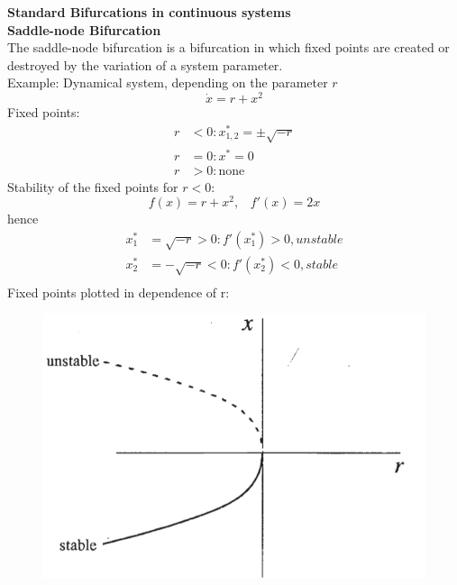 \textbf{Standard Bifurcations in continuous systems}\\
\textbf{Saddle-node Bifurcation}\\
The saddle-node bifurcation is a bifurcation in which fixed points are created or destroyed by the variation of a system parameter.\\
Example: Dynamical system, depending on the parameter $r$
\begin{equation}
  \dot{x} = r + x^2
\end{equation}
Fixed points:
\begin{equation}
  \begin{split}
    r& < 0: x^*_{1, 2} = \pm\sqrt{-r}\\
    r& = 0: x^* = 0\\
    r& > 0: \text{none}
  \end{split}
\end{equation}
Stability of the fixed points for $r<0$:
\begin{equation}
  f(x) = r + x^2, \;\;\; f'(x) = 2x
\end{equation}
hence
\begin{equation}
  \begin{split}
    x^*_1 &= \sqrt{-r} > 0: f'(x^*_1) > 0, unstable\\
    x^*_2 &= -\sqrt{-r} < 0: f'(x^*_2) < 0, stable\\
  \end{split}
\end{equation}
Fixed points plotted in dependence of r:
\begin{figure}[H]
  \centering
  \includegraphics[width=.5\linewidth]{Pics/9.1.png}
\end{figure}

